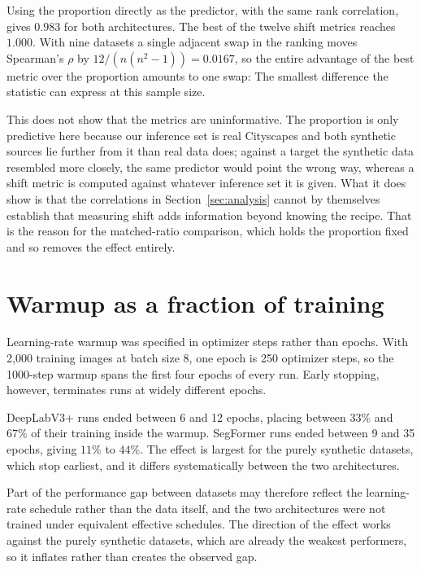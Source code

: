 \documentclass[conference]{IEEEtran}
\begin{document}
Using the proportion directly as the predictor, with the same rank correlation, gives $0.983$ for both architectures. The best of the twelve shift metrics reaches $1.000$. With nine datasets a single adjacent swap in the ranking moves Spearman's $\rho$ by $12/(n(n^2-1)) = 0.0167$, so the entire advantage of the best metric over the proportion amounts to one swap: The smallest difference the statistic can express at this sample size.

This does not show that the metrics are uninformative. The proportion is only predictive here because our inference set is real Cityscapes and both synthetic sources lie further from it than real data does; against a target the synthetic data resembled more closely, the same predictor would point the wrong way, whereas a shift metric is computed against whatever inference set it is given. What it does show is that the correlations in Section~\ref{sec:analysis} cannot by themselves establish that measuring shift adds information beyond knowing the recipe. That is the reason for the matched-ratio comparison, which holds the proportion fixed and so removes the effect entirely.

\section{Warmup as a fraction of training}
\label{sec:warmup}
Learning-rate warmup was specified in optimizer steps rather than epochs. With 2{,}000 training images at batch size $8$, one epoch is 250 optimizer steps, so the 1000-step warmup spans the first four epochs of every run. Early stopping, however, terminates runs at widely different epochs.

DeepLabV3+ runs ended between 6 and 12 epochs, placing between $33\%$ and $67\%$ of their training inside the warmup. SegFormer runs ended between 9 and 35 epochs, giving $11\%$ to $44\%$. The effect is largest for the purely synthetic datasets, which stop earliest, and it differs systematically between the two architectures.

Part of the performance gap between datasets may therefore reflect the learning-rate schedule rather than the data itself, and the two architectures were not trained under equivalent effective schedules. The direction of the effect works against the purely synthetic datasets, which are already the weakest performers, so it inflates rather than creates the observed gap.
\end{document}
